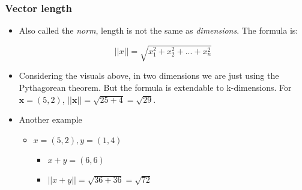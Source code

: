 \subsubsection{Vector length}

\begin{itemize}
    \item Also called the \emph{norm}, length is not the same as \emph{dimensions}. The formula is:

    \begin{equation*}
        ||x|| = \sqrt{x_1^2 + x_2^2 + ... + x_n^2}
    \end{equation*}

    \item Considering the visuals above, in two dimensions we are just using the Pythagorean theorem. But the formula is extendable to k-dimensions. For $\bm{x} = (5, 2)$, $||\bm{x}|| = \sqrt{25 + 4} = \sqrt{29}$.
    
    \item Another example
    \begin{itemize}
        \item $x = (5,2), y = (1,4)$
        \begin{itemize}
            \item $x + y = (6, 6)$
            \item $||x + y|| = \sqrt{36 + 36} = \sqrt{72}$
        
        \end{itemize}
    \end{itemize}

\end{itemize}

